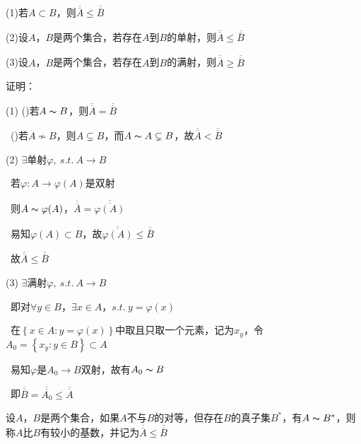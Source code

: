 \begin{wa}
\pmb{\textcolor{red}{$\bigstar$注：}}
\par (1)若$A \subset B$，则$\overline{\overline{A}} \leqslant \overline{\overline{B}}$
\par (2)设$A$，$B$是两个集合，若存在$A$到$B$的单射，则$\overline{\overline{A}} \leqslant \overline{\overline{B}}$
\par (3)设$A$，$B$是两个集合，若存在$A$到$B$的满射，则$\overline{\overline{A}} \geqslant \overline{\overline{B}}$    
\end{wa}
\noindent 证明：
\par (1) ()若$A\thicksim B$，则$\overline{\overline{A}} = \overline{\overline{B}}$
\par \quad \ ()若$A\nsim B$，则$A \subsetneq B$，而$A \thicksim A\subsetneq B$，故$\overline{\overline{A}} < \overline{\overline{B}}$
\par (2) $\exists$单射$\varphi ,\ s.t. \ A \to B$
\par \quad \ 若$\varphi :A \to \varphi (A)$是双射
\par \quad \ 则$A \thicksim \varphi (A)$，$\overline{\overline{A}} = \overline{\overline{\varphi (A)}}$
\par \quad \ 易知$\varphi (A)\subset B$，故$\overline{\overline{\varphi (A)}} \leqslant \overline{\overline{B}}$
\par \quad \ 故$\overline{\overline{A}} \leqslant \overline{\overline{B}}$
\par (3) $\exists$满射$\varphi ,\ s.t. \ A \to B$
\par \quad \ 即对$\forall y \in B$，$\exists x \in A$，$s.t. \ y = \varphi (x)$
\par \quad \ 在$\left\{x \in A : y = \varphi (x)\right\} $中取且只取一个元素，记为$x_{y}$，令$A_{0} = \left\{x_{y} : y \in B\right\} \subset A$
\par \quad \ 易知$\varphi$是$A_{0} \to B$双射，故有$A_{0}\thicksim B$
\par \quad \ 即$\overline{\overline{B}} = \overline{\overline{A_{0}}} \leqslant \overline{\overline{A}}$

\begin{td}
设$A$，$B$是两个集合，如果$A$不与$B$的对等，但存在$B$的真子集$B^{*}$，有$A \thicksim B^{*}$，则称$A$比$B$有较小的基数，并记为$\overline{\overline{A}} \leqslant \overline{\overline{B}}$    
\end{td}

